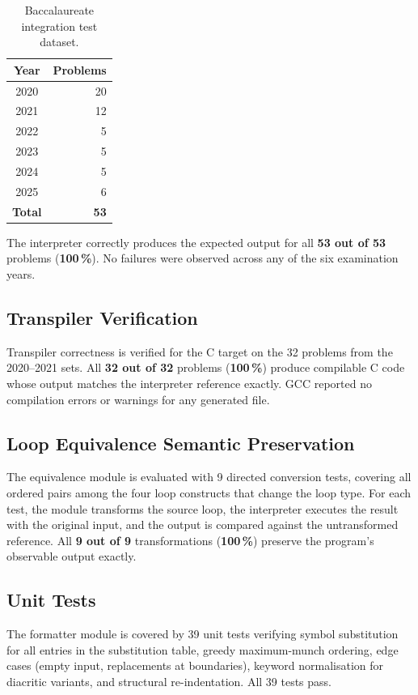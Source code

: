 \documentclass[conference]{IEEEtran}
\begin{document}
\begin{table}[h]
\centering
\small
\caption{Baccalaureate integration test dataset.}
\label{tab:dataset}
\begin{tabular}{cr}
\toprule
\textbf{Year} & \textbf{Problems} \\
\midrule
2020 & 20 \\
2021 & 12 \\
2022 &  5 \\
2023 &  5 \\
2024 &  5 \\
2025 &  6 \\
\midrule
\textbf{Total} & \textbf{53} \\
\bottomrule
\end{tabular}
\end{table}

The interpreter correctly produces the expected output for all
\textbf{53 out of 53} problems (\textbf{100\,\%}).  No failures were observed
across any of the six examination years.

\subsection{Transpiler Verification}

Transpiler correctness is verified for the C target on the 32 problems from
the 2020--2021 sets.  All \textbf{32 out of 32} problems (\textbf{100\,\%})
produce compilable C code whose output matches the interpreter reference
exactly.  GCC reported no compilation errors or warnings for any generated
file.
\subsection{Loop Equivalence Semantic Preservation}

The equivalence module is evaluated with 9 directed conversion tests, covering
all ordered pairs among the four loop constructs that change the loop type.
For each test, the module transforms the source loop, the interpreter executes
the result with the original input, and the output is compared against the
untransformed reference.  All \textbf{9 out of 9} transformations
(\textbf{100\,\%}) preserve the program's observable output exactly.

\subsection{Unit Tests}

The formatter module is covered by 39 unit tests verifying symbol
substitution for all entries in the substitution table, greedy maximum-munch
ordering, edge cases (empty input, replacements at boundaries), keyword
normalisation for diacritic variants, and structural re-indentation.
All 39 tests pass.
\end{document}
